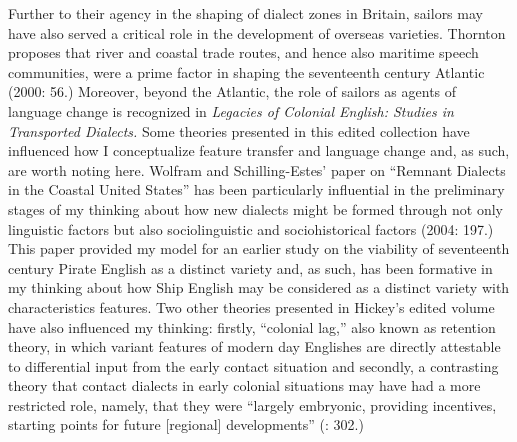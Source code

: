   Further to their agency in the shaping of dialect zones in Britain, sailors may have also served a critical role in the development of overseas varieties. Thornton proposes that river and coastal trade routes, and hence also maritime speech communities, were a prime factor in shaping the seventeenth century Atlantic (2000: 56.) Moreover, beyond the Atlantic, the role of sailors as agents of language change is recognized in  \textit{Legacies of Colonial English: Studies in Transported Dialects.} Some theories presented in this edited collection have influenced how I conceptualize feature transfer and language change and, as such, are worth noting here. Wolfram and Schilling-Estes’ paper on “Remnant Dialects in the Coastal United States” has been particularly influential in the preliminary stages of my thinking about how new dialects might be formed through not only linguistic factors but also sociolinguistic and sociohistorical factors (2004: 197.) This paper provided my model for an earlier study on the viability of seventeenth century Pirate English as a distinct variety \citep{Delgado2013} and, as such, has been formative in my thinking about how Ship English may be considered as a distinct variety with characteristics features. Two other theories presented in Hickey’s edited volume have also influenced my thinking: firstly, “colonial lag,” also known as retention theory, in which variant features of modern day Englishes are directly attestable to differential input from the early contact situation \citep[8,]{Hickey2004} and secondly, a contrasting theory that contact dialects in early colonial situations may have had a more restricted role, namely, that they were “largely embryonic, providing incentives, starting points for future [regional] developments” (\citealt{Schneider2004}: 302.) 

